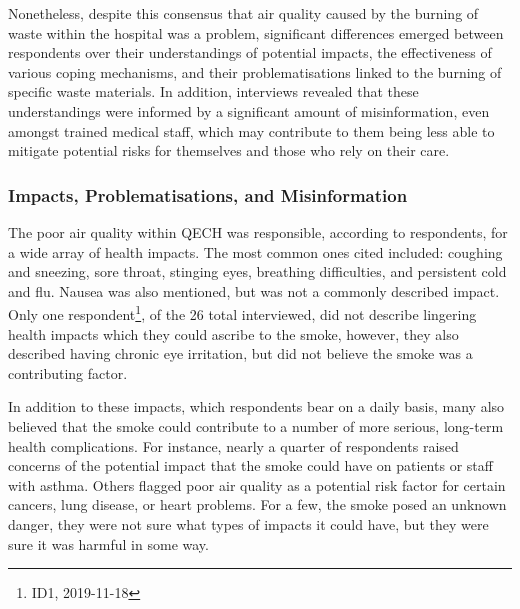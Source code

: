 \documentclass[
  authoryear,
  review,
  3p]{elsarticle}
\begin{document}
Nonetheless, despite this consensus that air quality caused by the
burning of waste within the hospital was a problem, significant
differences emerged between respondents over their understandings of
potential impacts, the effectiveness of various coping mechanisms, and
their problematisations linked to the burning of specific waste
materials. In addition, interviews revealed that these understandings
were informed by a significant amount of misinformation, even amongst
trained medical staff, which may contribute to them being less able to
mitigate potential risks for themselves and those who rely on their
care.

\hypertarget{impacts-problematisations-and-misinformation}{%
\subsubsection{Impacts, Problematisations, and
Misinformation}\label{impacts-problematisations-and-misinformation}}

The poor air quality within QECH was responsible, according to
respondents, for a wide array of health impacts. The most common ones
cited included: coughing and sneezing, sore throat, stinging eyes,
breathing difficulties, and persistent cold and flu. Nausea was also
mentioned, but was not a commonly described impact. Only one
respondent\footnote{ID1, 2019-11-18}, of the 26 total interviewed, did
not describe lingering health impacts which they could ascribe to the
smoke, however, they also described having chronic eye irritation, but
did not believe the smoke was a contributing factor.

In addition to these impacts, which respondents bear on a daily basis,
many also believed that the smoke could contribute to a number of more
serious, long-term health complications. For instance, nearly a quarter
of respondents raised concerns of the potential impact that the smoke
could have on patients or staff with asthma. Others flagged poor air
quality as a potential risk factor for certain cancers, lung disease, or
heart problems. For a few, the smoke posed an unknown danger, they were
not sure what types of impacts it could have, but they were sure it was
harmful in some way.
\end{document}
